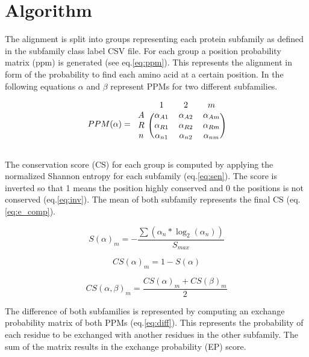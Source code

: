 \documentclass[a4paper,10pt]{article}
\begin{document}
\section{Algorithm} \label{algo}

The alignment is split into groups representing each protein subfamily as defined in the 
subfamily class label CSV file.
For each group a position probability matrix (ppm) is generated (see eq.\ref{eq:ppm}).
This represents the alignment in form of the probability to find each amino acid at a certain position.
In the following equations $\alpha$ and $\beta$ represent PPMs for two different subfamilies. 

\begin{equation} \label{eq:ppm}
PPM(\alpha) =
\begin{blockarray}{cccc}
 & 1 & 2  & m  \\
\begin{block}{c(ccc)}
  A & \alpha_{A1} & \alpha_{A2}  & \alpha_{Am} \\
  R & \alpha_{R1} & \alpha_{R2}  & \alpha_{Rm} \\
  n & \alpha_{n1} & \alpha_{n2}  & \alpha_{nm} \\
\end{block}
\end{blockarray}
\end{equation}

The conservation score (CS) for each group is computed by applying the normalized Shannon entropy
for each subfamily (eq.\ref{eq:sen}). The score is inverted so that 1 means the position highly conserved and 0
the positions is not conserved (eq.\ref{eq:inv}). The mean of both subfamily represents the final CS (eq.\ref{eq:e_comp}).

\begin{equation} \label{eq:sen}
S(\alpha)_m = -\frac{\sum(\alpha_n*\log_2(\alpha_n))}{S_{max}}
\end{equation}

\begin{equation} \label{eq:inv}
CS(\alpha)_m = 1 - S(\alpha) 
\end{equation}

\begin{equation} \label{eq:e_comp}
CS(\alpha, \beta)_m = \frac{CS(\alpha)_m + CS(\beta)_m}{2}
\end{equation}

The difference of both subfamilies is represented by computing an 
exchange probability matrix of both PPMs (eq.\ref{eq:diff}).
This represents the probability of each residue to be exchanged with another
residues in the other subfamily. The sum of the matrix results in the
exchange probability (EP) score.
\end{document}

